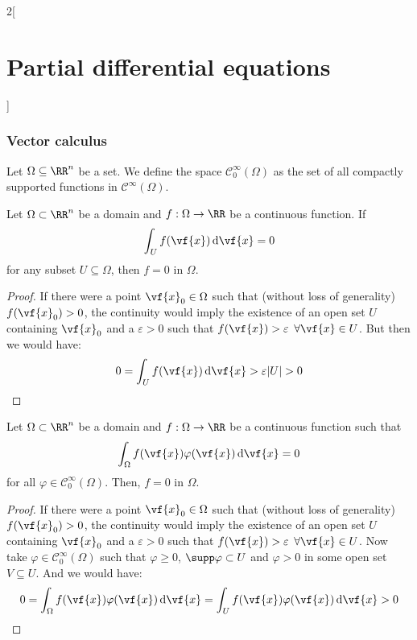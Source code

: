 \documentclass[../../../main_math.tex]{subfiles}
\begin{document}
\begin{multicols}{2}[\section{Partial differential equations}]
  \subsubsection{Vector calculus}
  \begin{definition}
    Let $\Omega\subseteq \RR^n$ be a set. We define the space $\mathcal{C}_0^\infty(\Omega)$ as the set of all compactly supported functions in $\mathcal{C}^\infty(\Omega)$.
  \end{definition}
  \begin{theorem}\label{PDE:fundamentallemma}
    Let $\Omega\subset\RR^n$ be a domain and $f:\Omega\rightarrow\RR$ be a continuous function. If $$\int_U f(\vf{x})\dd{\vf{x}}=0$$ for any subset  $U\subseteq\Omega$, then $f=0$ in $\Omega$.
  \end{theorem}
  \begin{proof}
    If there were a point $\vf{x}_0\in \Omega$ such that (without loss of generality) $f(\vf{x}_0)>0$, the continuity would imply the existence of an open set $U$ containing $\vf{x}_0$ and a $\varepsilon >0$ such that $f(\vf{x})>\varepsilon$ $\forall \vf{x}\in U$. But then we would have: $$0=\int_U f(\vf{x})\dd{\vf{x}}>\varepsilon\abs{U}>0$$
  \end{proof}
  \begin{corollary}\label{PDE:postfundamentallemma}
    Let $\Omega\subset\RR^n$ be a domain and $f:\Omega\rightarrow\RR$ be a continuous function such that $$\int_\Omega f(\vf{x})\varphi(\vf{x})\dd{\vf{x}}=0$$ for all $\varphi\in\mathcal{C}_0^\infty(\Omega)$. Then, $f=0$ in $\Omega$.
  \end{corollary}
  \begin{proof}
    If there were a point $\vf{x}_0\in \Omega$ such that (without loss of generality) $f(\vf{x}_0)>0$, the continuity would imply the existence of an open set $U$ containing $\vf{x}_0$ and a $\varepsilon >0$ such that $f(\vf{x})>\varepsilon$ $\forall \vf{x}\in U$. Now take $\varphi\in\mathcal{C}_0^\infty(\Omega)$ such that $\varphi\geq 0$, $\supp\varphi\subset U$ and $\varphi>0$ in some open set $V\subseteq U$. And we would have: $$0=\int_\Omega f(\vf{x})\varphi(\vf{x})\dd{\vf{x}}=\int_U f(\vf{x})\varphi(\vf{x})\dd{\vf{x}}>0$$

\end{proof}
\end{multicols}
\end{document}
